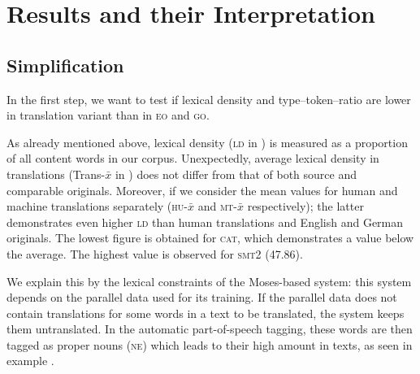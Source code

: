 \documentclass[output=paper]{LSP/langsci}
\begin{document}
\section{Results and their Interpretation} \label{sec:4:4} 
\subsection{Simplification}
In the first step, we want to test if lexical density and type--token--ratio are lower in translation variant than in \textsc{eo} and \textsc{go}.


\begin{table}
     \centering
 \caption{\textsc{sttr} and \textsc{ld} in \textsc{vartra}-\textsc{small}}
     \label{tab:4.2}
\end{table}

\newpage
As already mentioned above, lexical density (\textsc{ld} in ) is measured as a proportion of all content words in our corpus. Unexpectedly, average lexical density in translations (Trans-$\bar{x}$ in ) does not differ from that of both source and comparable originals. Moreover, if we consider the mean values for human and machine translations separately (\textsc{hu}-$\bar{x}$ and \textsc{mt}-$\bar{x}$ respectively); the latter demonstrates even higher \textsc{ld} than human translations and English and German originals. The lowest figure is obtained for \textsc{cat}, which demonstrates a value below the average. The highest value is observed for \textsc{smt}2 (47.86).

We explain this by the lexical constraints of the Moses-based system: this system depends on the parallel data used for its training.  If the parallel data does not contain translations for some words in a text to be translated, the system keeps them untranslated. In the automatic part-of-speech tagging, these words are then tagged as proper nouns (\textsc{ne}) which leads to their high amount in texts, as seen in example .
\end{document}
